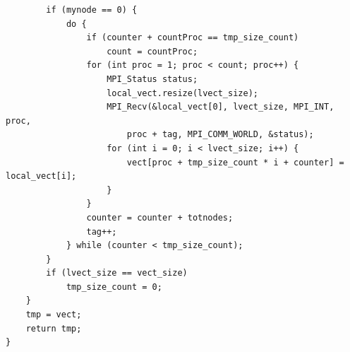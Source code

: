 \documentclass[12pt, letterpaper]{report}
\begin{document}
\begin{verbatim}
        if (mynode == 0) {
            do {
                if (counter + countProc == tmp_size_count)
                    count = countProc;
                for (int proc = 1; proc < count; proc++) {
                    MPI_Status status;
                    local_vect.resize(lvect_size);
                    MPI_Recv(&local_vect[0], lvect_size, MPI_INT, proc,
                        proc + tag, MPI_COMM_WORLD, &status);
                    for (int i = 0; i < lvect_size; i++) {
                        vect[proc + tmp_size_count * i + counter] = local_vect[i];
                    }
                }
                counter = counter + totnodes;
                tag++;
            } while (counter < tmp_size_count);
        }
        if (lvect_size == vect_size)
            tmp_size_count = 0;        
    }
    tmp = vect;
    return tmp;
}
 	\end{verbatim}
\end{document}
